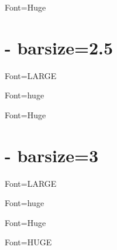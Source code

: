 \documentclass[12pt]{article}
\begin{document}
\def\chordFontSize{\Huge\bfseries}
\begin{chordbar}{4}{Font=Huge}
\end{chordbar}


\section{- barsize=2.5}
\def\barsize{2.5}%

\def\chordFontSize{\LARGE\bfseries}
\begin{chordbar}{4}{Font=LARGE}
\end{chordbar}

\def\chordFontSize{\huge\bfseries}
\begin{chordbar}{4}{Font=huge}
\end{chordbar}


\def\chordFontSize{\Huge\bfseries}
\begin{chordbar}{4}{Font=Huge}
\end{chordbar}

\section{- barsize=3}
\def\barsize{3}%

\def\chordFontSize{\LARGE\bfseries}
\begin{chordbar}{4}{Font=LARGE}
\end{chordbar}

\def\chordFontSize{\huge\bfseries}
\begin{chordbar}{4}{Font=huge}
\end{chordbar}


\def\chordFontSize{\Huge\bfseries}
\begin{chordbar}{4}{Font=Huge}
\end{chordbar}

\def\chordFontSize{\HUGE\bfseries}
\begin{chordbar}{4}{Font=HUGE}
\end{chordbar}
\end{document}

